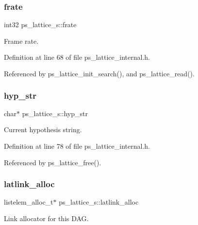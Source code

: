\mbox{\label{structps__lattice__s_a5159a2ff1e03a7c9782854bc67e56530}} 
\subsubsection{frate}
{\footnotesize\ttfamily int32 ps\+\_\+lattice\+\_\+s\+::frate}



Frame rate. 



Definition at line 68 of file ps\+\_\+lattice\+\_\+internal.\+h.



Referenced by ps\+\_\+lattice\+\_\+init\+\_\+search(), and ps\+\_\+lattice\+\_\+read().

\mbox{\label{structps__lattice__s_ac3844c69f8393b607047bd9b302b979a}} 
\subsubsection{hyp\+\_\+str}
{\footnotesize\ttfamily char$\ast$ ps\+\_\+lattice\+\_\+s\+::hyp\+\_\+str}



Current hypothesis string. 



Definition at line 78 of file ps\+\_\+lattice\+\_\+internal.\+h.



Referenced by ps\+\_\+lattice\+\_\+free().

\mbox{\label{structps__lattice__s_afa8ca535dc8bf2cc656f6ad477e13b9f}} 
\subsubsection{latlink\+\_\+alloc}
{\footnotesize\ttfamily listelem\+\_\+alloc\+\_\+t$\ast$ ps\+\_\+lattice\+\_\+s\+::latlink\+\_\+alloc}



Link allocator for this D\+AG. 



